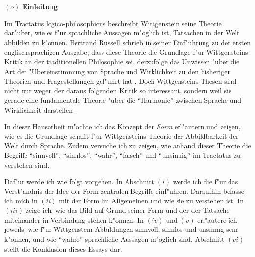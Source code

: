 \documentclass[a4paper, emulatestandardclasses, 12pt]{scrartcl}
\begin{document}
\begin{onehalfspace} 



\noindent\textbf{$(o)$ Einleitung}

\noindent Im Tractatus logico-philosophicus \citep{wittgenstein1963tractatus} beschreibt Wittgenstein seine Theorie dar"uber, wie es f"ur sprachliche Aussagen m"oglich ist, Tatsachen in der Welt abbilden zu k"onnen. Bertrand Russell schrieb in seiner Einf"uhrung zu der ersten englischsprachigen Ausgabe, dass diese Theorie die Grundlage f"ur Wittgensteins Kritik an der traditionellen Philosophie sei, derzufolge das Unwissen "uber die Art der "Ubereinstimmung von Sprache und Wirklichkeit zu den bisherigen Theorien und Fragestellungen gef"uhrt hat \cite[vgl.][S. 7]{wittgenstein1922tractatus}. Doch Wittgensteins Thesen sind nicht nur wegen der daraus folgenden Kritik so interessant, sondern weil sie gerade eine fundamentale Theorie "uber die "`Harmonie"' zwischen Sprache und Wirklichkeit darstellen \cite[vgl.][S. 1]{emiliani1999formsp}.

In dieser Hausarbeit m"ochte ich das Konzept der \emph{Form} erl"autern und zeigen, wie es die Grundlage schafft f"ur Wittgensteins Theorie der Abbildbarkeit der Welt durch Sprache. Zudem versuche ich zu zeigen, wie anhand dieser Theorie die Begriffe "`sinnvoll"', "`sinnlos"', "`wahr"', "`falsch"' und "`unsinnig"' im Tractatus zu verstehen sind.


Daf"ur werde ich wie folgt vorgehen. In Abschnitt $(i)$ werde ich die f"ur das Verst"andnis der Idee der Form zentralen Begriffe einf"uhren. Daraufhin befasse ich mich in $(ii)$ mit der Form im Allgemeinen und wie sie zu verstehen ist. In $(iii)$ zeige ich, wie das Bild auf Grund seiner Form und der der Tatsache miteinander in Verbindung stehen k"onnen. In $(iv)$ und $(v)$ erl"autere ich jeweils, wie f"ur Wittgenstein Abbildungen sinnvoll, sinnlos und unsinnig sein k"onnen, und wie "`wahre"' sprachliche Aussagen m"oglich sind. Abschnitt $(vi)$ stellt die Konklusion dieses Essays dar.
\vspace{5mm}




\end{onehalfspace}
\end{document}
